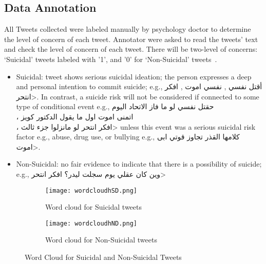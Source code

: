 \documentclass[11pt]{article}
\begin{document}
\subsection{Data Annotation}
All Tweets collected were labeled manually by psychology doctor to determine the level of concern of each tweet. Annotator were asked to read the tweets’ text and check the level of concern of each tweet. There will be two-level of concerns: ‘Suicidal’ tweets labeled with '1', and '0' for ‘Non-Suicidal’ tweets~\cite{11o2015detecting}.

\begin{itemize}
\item Suicidal: tweet shows serious suicidal ideation; the person expresses a deep and personal intention to commit suicide; e.g., \<أقتل نفسي , نفسي اموت , افكر انتحر>. In contrast, a  suicide risk will not be considered if connected to some type of conditional event e.g., \<حقتل نفسي لو ما فاز الاتحاد اليوم \\، اتمنى اموت اول ما يقول الدكتور كويز \\، افكر انتحر لو مانزلوا جزء ثالث> unless this event was a serious suicidal risk factor e.g., abuse, drug use, or bullying e.g., \<كلامها القذر تجاوز قوتي ابى اموت>.
\item Non-Suicidal: no fair evidence to indicate that there is a possibility of suicide; 
e.g., \<وين كان عقلي يوم سجلت  ليدر؟ 
افكر انتحر>
\end{itemize} %

\begin{figure*}[t!]
    \centering
    \begin{subfigure}[t]{0.45\textwidth}
        \centering
        \texttt{[image: wordcloudhSD.png]}
        \caption{\label{figW1} Word cloud for Suicidal tweets}
    \end{subfigure}%
    \begin{subfigure}[t]{0.45\textwidth}
        \centering
        \texttt{[image: wordcloudhND.png]}
        \caption{\label{figW2} Word cloud for Non-Suicidal tweets}
    \end{subfigure}
    \caption{ Word Cloud for Suicidal and Non-Suicidal Tweets}
\end{figure*}
\end{document}
